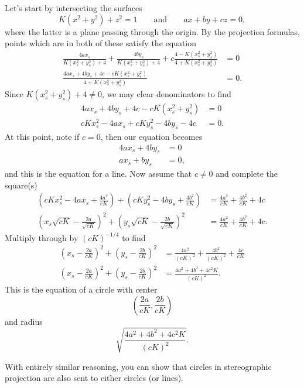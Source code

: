 \documentclass[newpage,hints,handout]{ximera}
\begin{document}
\begin{problem}
\begin{freeResponse}
  Let's start by intersecting the surfaces
  \[
  K(x^2+y^2)+z^2=1\qquad\text{and}\qquad ax+by+cz=0,
  \]
  where the latter is a plane passing through the origin.  By the projection
  formulas, points which are in both of these satisfy the equation
\begin{align*}
\frac{4ax_s}{K(x_s^2 + y_s^2) + 4}+\frac{4by_s}{K(x_s^2 + y_s^2) + 4}+c\frac{4-K(x_s^2 + y_s^2)}{4+K(x_s^2 + y_s^2)}&=0\\
 \frac{4ax_s+4by_s+4c-cK(x_s^2 + y_s^2)}{4+K(x_s^2 + y_s^2)}&=0.
\end{align*}
Since $K\left(x_s^2 + y_s^2\right) + 4 \ne 0$, we may clear
denominators to find 
  \begin{align*}
    4ax_s+4by_s+4c-cK\left(x_s^2+y_s^2\right) &= 0\\
    cKx_s^2-4ax_s + cKy_s^2-4by_s-4c &= 0.
  \end{align*}
  At this point, note if $c=0$, then our equation becomes
  \begin{align*}
    4ax_s+4by_s &= 0\\
    ax_s + by_s &= 0,
  \end{align*}
  and this is the equation for a line. Now assume that $c\ne 0$ and
  complete the square(s)
  \begin{align*}
  \left(cKx_s^2 - 4ax_s + \frac{4a^2}{cK}\right) + \left(cKy_s^2 - 4by_s + \frac{4b^2}{cK}\right) &=
  \frac{4a^2}{cK} + \frac{4b^2}{cK} + 4c\\
  \left(x_s\sqrt{cK} - \frac{2a}{\sqrt{cK}}\right)^2 + \left(y_s\sqrt{cK} - \frac{2b}{\sqrt{cK}}\right)^2&=\frac{4a^2}{cK} + \frac{4b^2}{cK} + 4c.
  \end{align*}
  Multiply through by $(cK)^{-1/4}$ to find
  \begin{align*}
    \left(x_s - \frac{2a}{cK}\right)^2 + \left(y_s - \frac{2b}{cK}\right)^2 &= \frac{4a^2}{(cK)^2} + \frac{4b^2}{(cK)^2} + \frac{4c}{cK}\\
    \left(x_s - \frac{2a}{cK}\right)^2 + \left(y_s - \frac{2b}{cK}\right)^2 &= \frac{4a^2 + 4b^2 + 4c^2K}{(cK)^2}.
  \end{align*}
  This is the equation of a circle with center
  \[
  \left(\frac{2a}{cK}, \frac{2b}{cK}\right)
  \]
  and radius
  \[
  \sqrt{\frac{4a^2 + 4b^2 + 4c^2K}{(cK)^2}}.
  \]
\end{freeResponse}
\end{problem}



\begin{remark}
  With entirely similar reasoning, you can show that circles in
  stereographic projection are also sent to either circles (or lines).
\end{remark}
\end{document}
